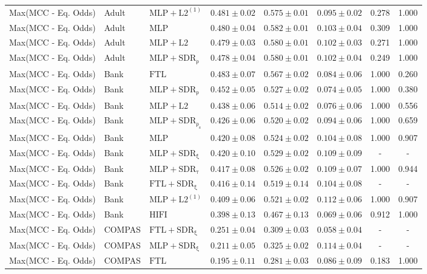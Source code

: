 \begin{table}[htbp]
\begin{tabular}{lllccccc}
Max(MCC - Eq. Odds) & Adult & $\mathrm{MLP+L2^{(1)}}$ & $0.481 \pm0.02$ & $0.575 \pm0.01$ & $0.095 \pm0.02$ & 0.278 & 1.000 \\
Max(MCC - Eq. Odds) & Adult & $\mathrm{MLP}$ & $0.480 \pm0.04$ & $0.582 \pm0.01$ & $0.103 \pm0.04$ & 0.309 & 1.000 \\
Max(MCC - Eq. Odds) & Adult & $\mathrm{MLP+L2}$ & $0.479 \pm0.03$ & $0.580 \pm0.01$ & $0.102 \pm0.03$ & 0.271 & 1.000 \\
Max(MCC - Eq. Odds) & Adult & $\mathrm{MLP+SDR_{\rho}}$ & $0.478 \pm0.04$ & $0.580 \pm0.01$ & $0.102 \pm0.04$ & 0.249 & 1.000 \\
Max(MCC - Eq. Odds) & Bank & $\mathrm{FTL}$ & $0.483 \pm0.07$ & $0.567 \pm0.02$ & $0.084 \pm0.06$ & 1.000 & 0.260 \\
Max(MCC - Eq. Odds) & Bank & $\mathrm{MLP+SDR_{\rho}}$ & $0.452 \pm0.05$ & $0.527 \pm0.02$ & $0.074 \pm0.05$ & 1.000 & 0.380 \\
Max(MCC - Eq. Odds) & Bank & $\mathrm{MLP+L2}$ & $0.438 \pm0.06$ & $0.514 \pm0.02$ & $0.076 \pm0.06$ & 1.000 & 0.556 \\
Max(MCC - Eq. Odds) & Bank & $\mathrm{MLP+SDR_{\rho_s}}$ & $0.426 \pm0.06$ & $0.520 \pm0.02$ & $0.094 \pm0.06$ & 1.000 & 0.659 \\
Max(MCC - Eq. Odds) & Bank & $\mathrm{MLP}$ & $0.420 \pm0.08$ & $0.524 \pm0.02$ & $0.104 \pm0.08$ & 1.000 & 0.907 \\
Max(MCC - Eq. Odds) & Bank & $\mathrm{MLP+SDR_{\xi}}$ & $0.420 \pm0.10$ & $0.529 \pm0.02$ & $0.109 \pm0.09$ & - & - \\
Max(MCC - Eq. Odds) & Bank & $\mathrm{MLP+SDR_{\tau}}$ & $0.417 \pm0.08$ & $0.526 \pm0.02$ & $0.109 \pm0.07$ & 1.000 & 0.944 \\
Max(MCC - Eq. Odds) & Bank & $\mathrm{FTL+SDR_{\xi}}$ & $0.416 \pm0.14$ & $0.519 \pm0.14$ & $0.104 \pm0.08$ & - & - \\
Max(MCC - Eq. Odds) & Bank & $\mathrm{MLP+L2^{(1)}}$ & $0.409 \pm0.06$ & $0.521 \pm0.02$ & $0.112 \pm0.06$ & 1.000 & 0.907 \\
Max(MCC - Eq. Odds) & Bank & $\mathrm{HIFI}$ & $0.398 \pm0.13$ & $0.467 \pm0.13$ & $0.069 \pm0.06$ & 0.912 & 1.000 \\
Max(MCC - Eq. Odds) & COMPAS & $\mathrm{FTL+SDR_{\xi}}$ & $0.251 \pm0.04$ & $0.309 \pm0.03$ & $0.058 \pm0.04$ & - & - \\
Max(MCC - Eq. Odds) & COMPAS & $\mathrm{MLP+SDR_{\xi}}$ & $0.211 \pm0.05$ & $0.325 \pm0.02$ & $0.114 \pm0.04$ & - & - \\
Max(MCC - Eq. Odds) & COMPAS & $\mathrm{FTL}$ & $0.195 \pm0.11$ & $0.281 \pm0.03$ & $0.086 \pm0.09$ & 0.183 & 1.000 \\

\end{tabular}
\end{table}
